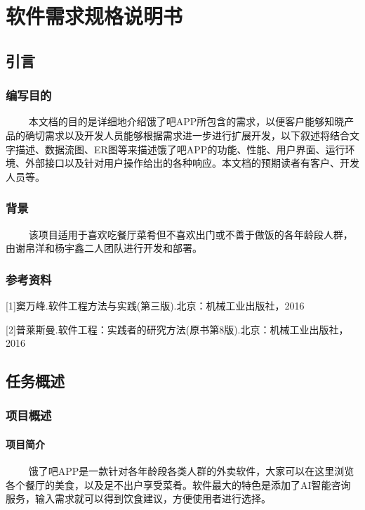 \chapter{软件需求规格说明书}
\section{引言}

\subsection{编写目的}

  
本文档的目的是详细地介绍饿了吧APP所包含的需求，以便客户能够知晓产品的确切需求以及开发人员能够根据需求进一步进行扩展开发，以下叙述将结合文字描述、数据流图、ER图等来描述饿了吧APP的功能、性能、用户界面、运行环境、外部接口以及针对用户操作给出的各种响应。本文档的预期读者有客户、开发人员等。

\subsection{背景}

  
该项目适用于喜欢吃餐厅菜肴但不喜欢出门或不善于做饭的各年龄段人群，由谢帛洋和杨宇鑫二人团队进行开发和部署。

\subsection{参考资料}

{[}1{]}窦万峰.软件工程方法与实践(第三版).北京：机械工业出版社，2016

{[}2{]}普莱斯曼.软件工程：实践者的研究方法(原书第8版).北京：机械工业出版社，2016

\section{任务概述}

\subsection{项目概述}


\subsubsection{项目简介}
  
饿了吧APP是一款针对各年龄段各类人群的外卖软件，大家可以在这里浏览各个餐厅的美食，以及足不出户享受菜肴。软件最大的特色是添加了AI智能咨询服务，输入需求就可以得到饮食建议，方便使用者进行选择。

